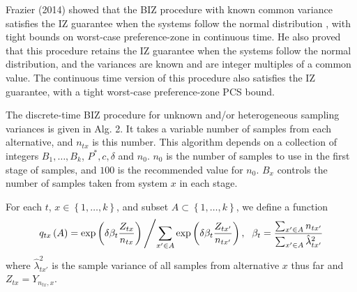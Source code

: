 \documentclass{wscpaperproc}
\theoremstyle{wsc}
\begin{document}
Frazier (2014) showed that the BIZ procedure with known common variance
satisfies the IZ guarantee when the systems follow the normal distribution
, with tight bounds on worst-case preference-zone in continuous time.
He also proved that this procedure retains the IZ guarantee when the
systems follow the normal distribution, and the variances are known
and are integer multiples of a common value. The continuous time version
of this procedure also satisfies the IZ guarantee, with a tight worst-case
preference-zone PCS bound.

The discrete-time BIZ procedure for unknown and/or heterogeneous sampling
variances is given in Alg. 2. It takes a variable number of samples
from each alternative, and $n_{tx}$ is this number. This algorithm
depends on a collection of integers $B_{1},\ldots,B_{k}$, $P^{*},c,\delta$
and $n_{0}$. $n_{0}$ is the number of samples to use in the first
stage of samples, and $100$ is the recommended value for $n_{0}$.
$B_{x}$ controls the number of samples taken from system $x$ in
each stage. 

For each $t$, $x\in\left\{ 1,\ldots,k\right\} $, and subset $A\subset\left\{ 1,\ldots,k\right\} $,
we define a function
\[
q_{tx}\left(A\right)=\mbox{exp}\left(\delta\beta_{t}\frac{Z_{tx}}{n_{tx}}\right)\left/\sum_{x'\in A}\mbox{exp}\left(\delta\beta_{t}\frac{Z_{tx'}}{n_{tx'}}\right),\right.\mbox{ }\beta_{t}=\frac{\sum_{x'\in A}n_{tx'}}{\sum_{x'\in A}\hat{\lambda}_{tx'}^{2}}
\]
where $\hat{\lambda}_{tx'}^{2}$ is the sample variance of all samples
from alternative $x$ thus far and $Z_{tx}=Y_{n_{tx},x}$.

\vspace{10mm}
   
\end{document}
